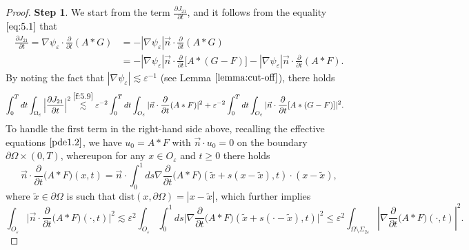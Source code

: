 \documentclass[13pt,CJK]{article}
\theoremstyle{plain}                       %
\theoremstyle{remark}
\numberwithin{equation}{section}
\begin{document}
\begin{proof}
\textbf{Step 1}. We start from the term $\frac{\partial J_{21}}{\partial t}$,
and it follows from the equality $\eqref{eq:5.1}$ that
\begin{equation}\label{f:5.9}
\begin{aligned}
\frac{\partial J_{21}}{\partial t}
= \nabla \psi_{\varepsilon}\cdot \frac{\partial }{\partial t}( A\ast G)
&= -|\nabla\psi_\varepsilon|\vec{n}\cdot \frac{\partial }{\partial t}( A\ast G)\\
&=-|\nabla\psi_\varepsilon|\vec{n}\cdot \frac{\partial }{\partial t}\big[A\ast (G-F)\big] -|\nabla\psi_\varepsilon|\vec{n}\cdot \frac{\partial }{\partial t}( A\ast F).
\end{aligned}
\end{equation}
By noting the fact that $|\nabla\psi_{\varepsilon}|\lesssim
\varepsilon^{-1}$ (see Lemma $\ref{lemma:cut-off}$), there holds
\begin{equation}\label{f:5.10}
\begin{aligned}
\int_{0}^{T}dt\int_{\Omega_{\varepsilon}}\Big|\frac{\partial J_{21}}{\partial t}\Big|^2
&\overset{\eqref{f:5.9}}{\lesssim} \varepsilon^{-2}
\int_{0}^{T}dt\int_{O_{\varepsilon}}
|\vec{n}\cdot\frac{\partial }{\partial t}( A\ast F)|^2
+\varepsilon^{-2}
\int_{0}^{T}dt\int_{O_{\varepsilon}}
|\vec{n}\cdot\frac{\partial }{\partial t}[ A\ast (G-F)]|^2.
\end{aligned}
\end{equation}
To handle the first term in the right-hand side above,
recalling the effective equations $\eqref{pde1.2}$, we have
$u_0=A\ast F$ with $\vec{n}\cdot u_0=0$ on the boundary $\partial\Omega\times(0,T)$,
whereupon for any $x\in O_\varepsilon$ and $t\geq 0$ there holds
\begin{equation*}
\vec{n}\cdot
\frac{\partial}{\partial t}\big(A\ast F\big)(x,t)
=\vec{n}\cdot \int_{0}^{1}ds\nabla
\frac{\partial}{\partial t}\big(A\ast F\big)(\tilde{x}+s(x-\tilde{x}),t)
\cdot(x-\tilde{x}),
\end{equation*}
where $\tilde{x}\in\partial\Omega$ is such that $\text{dist}(x,\partial\Omega)
=|x-\tilde{x}|$,
which further implies
\begin{equation*}
\int_{O_\varepsilon}\Big|\vec{n}\cdot \frac{\partial}{\partial t}
\big(A\ast F\big)(\cdot,t)\Big|^2
\lesssim \varepsilon^2
\int_{O_\varepsilon}\int_{0}^{1}ds
\big|\nabla \frac{\partial}{\partial t}\big(A\ast F\big)
(\tilde{x}+s(\cdot
-\tilde{x}),t)\big|^2
\leq \varepsilon^2\int_{\Omega\setminus \Sigma_{2\varepsilon}}
|\nabla \frac{\partial}{\partial t}\big(A\ast F\big)(\cdot,t)|^2.

\end{equation*}
\end{proof}
\end{document}
